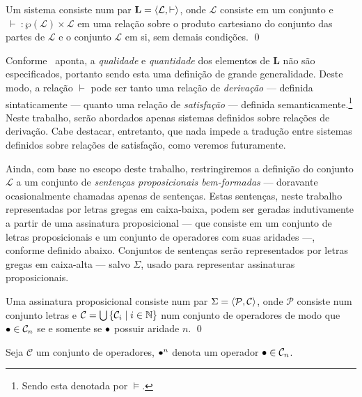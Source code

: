 \begin{definition}[Sistema]
    Um sistema consiste num par $\mathbf{L} = \langle\mathcal{L}, \vdash\rangle$, onde $\mathcal{L}$ consiste em um conjunto e $\, \vdash \: : \wp(\mathcal{L}) \times \mathcal{L}$ em uma relação sobre o produto cartesiano do conjunto das partes de $\mathcal{L}$ e o conjunto $\mathcal{L}$ em si, sem demais condições.
    \qed{}
\end{definition}

Conforme~\cite{Beziau} aponta, a \emph{qualidade} e \emph{quantidade} dos elementos de $\mathbf{L}$ não são especificados, portanto sendo esta uma definição de grande generalidade. Deste modo, a relação $\vdash$ pode ser tanto uma relação de \emph{derivação} --- definida sintaticamente --- quanto uma relação de \emph{satisfação} --- definida semanticamente.\footnote{Sendo esta denotada por $\mathrel{\vDash}$.} Neste trabalho, serão abordados apenas sistemas definidos sobre relações de derivação. Cabe destacar, entretanto, que nada impede a tradução entre sistemas definidos sobre relações de satisfação, como veremos futuramente.

Ainda, com base no escopo deste trabalho, restringiremos a definição do conjunto $\mathcal{L}$ a um conjunto de \emph{sentenças proposicionais bem-formadas} --- doravante ocasionalmente chamadas apenas de sentenças. Estas sentenças, neste trabalho representadas por letras gregas em caixa-baixa, podem ser geradas indutivamente a partir de uma assinatura proposicional --- que consiste em um conjunto de letras proposicionais e um conjunto de operadores com suas aridades ---, conforme definido abaixo. Conjuntos de sentenças serão representados por letras gregas em caixa-alta --- salvo $\Sigma$, usado para representar assinaturas proposicionais.

\begin{definition}[Assinatura]
    Uma assinatura proposicional consiste num par $\Sigma=\langle\mathcal{P},\mathcal{C}\rangle$, onde $\mathcal{P}$ consiste num conjunto letras e $\mathcal{C}=\bigcup\left\{\mathcal{C}_i\mid i\in\mathbb{N}\right\}$ num conjunto de operadores de modo que $\mathalpha{\bullet}\in\mathcal{C}_n$ se e somente se $\mathalpha{\bullet}$ possuir aridade $n$.
    \qed{}
\end{definition}

\begin{notation}
    Seja $\mathcal{C}$ um conjunto de operadores, $\mathalpha{\bullet}^n$ denota um operador $\mathalpha{\bullet}\in\mathcal{C}_n$.
\end{notation}

